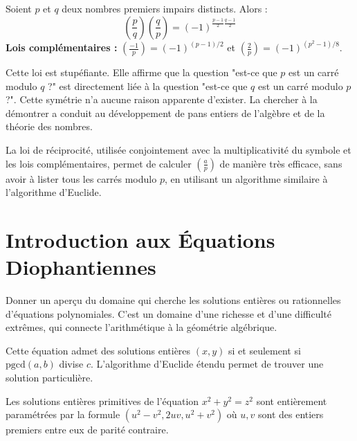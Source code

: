 \begin{theorem}
    Soient $p$ et $q$ deux nombres premiers impairs distincts. Alors :
    $$ \left(\frac{p}{q}\right) \left(\frac{q}{p}\right) = (-1)^{\frac{p-1}{2}\frac{q-1}{2}} $$
    \textbf{Lois complémentaires :} $\left(\frac{-1}{p}\right) = (-1)^{(p-1)/2}$ et $\left(\frac{2}{p}\right) = (-1)^{(p^2-1)/8}$.
\end{theorem}

\begin{remark}
    Cette loi est stupéfiante. Elle affirme que la question "est-ce que $p$ est un carré modulo $q$ ?" est directement liée à la question "est-ce que $q$ est un carré modulo $p$ ?". Cette symétrie n'a aucune raison apparente d'exister. La chercher à la démontrer a conduit au développement de pans entiers de l'algèbre et de la théorie des nombres.
\end{remark}

\begin{application}
    La loi de réciprocité, utilisée conjointement avec la multiplicativité du symbole et les lois complémentaires, permet de calculer $\left(\frac{a}{p}\right)$ de manière très efficace, sans avoir à lister tous les carrés modulo $p$, en utilisant un algorithme similaire à l'algorithme d'Euclide.
\end{application}

\section{Introduction aux Équations Diophantiennes}

\begin{objectif}
    Donner un aperçu du domaine qui cherche les solutions entières ou rationnelles d'équations polynomiales. C'est un domaine d'une richesse et d'une difficulté extrêmes, qui connecte l'arithmétique à la géométrie algébrique.
\end{objectif}

\begin{proposition}[Équations linéaires $ax+by=c$]
    Cette équation admet des solutions entières $(x,y)$ si et seulement si $\mathrm{pgcd}(a,b)$ divise $c$. L'algorithme d'Euclide étendu permet de trouver une solution particulière.
\end{proposition}

\begin{theorem}
    Les solutions entières primitives de l'équation $x^2+y^2=z^2$ sont entièrement paramétrées par la formule $(u^2-v^2, 2uv, u^2+v^2)$ où $u, v$ sont des entiers premiers entre eux de parité contraire.
\end{theorem}

